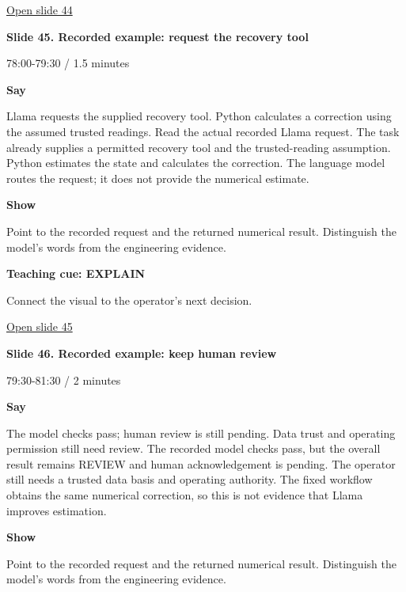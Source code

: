 \documentclass[12pt,letterpaper]{article}
\begin{document}
\vfill\href{https://alaaselim-sudo.github.io/GridGuard-Agentic-AI-Tutorials/operator-cases/#/44}{Open slide 44}\par
\clearpage{}
{\Large\bfseries\color{IEEEBlue} Slide 45. Recorded example: request the recovery tool\par}\medskip
{\small\color{Slate} 78:00-79:30 /\allowbreak{} 1.5 minutes\par}\medskip
\textbf{Say}\par Llama requests the supplied recovery tool. Python calculates a correction using the assumed trusted readings. Read the actual recorded Llama request. The task already supplies a permitted recovery tool and the trusted-reading assumption. Python estimates the state and calculates the correction. The language model routes the request; it does not provide the numerical estimate.\par\medskip
\textbf{Show}\par Point to the recorded request and the returned numerical result. Distinguish the model's words from the engineering evidence.\par\medskip
\textbf{Teaching cue: EXPLAIN}\par Connect the visual to the operator's next decision.\par\medskip
\vfill\href{https://alaaselim-sudo.github.io/GridGuard-Agentic-AI-Tutorials/operator-cases/#/45}{Open slide 45}\par
\clearpage{}
{\Large\bfseries\color{IEEEBlue} Slide 46. Recorded example: keep human review\par}\medskip
{\small\color{Slate} 79:30-81:30 /\allowbreak{} 2 minutes\par}\medskip
\textbf{Say}\par The model checks pass; human review is still pending. Data trust and operating permission still need review. The recorded model checks pass, but the overall result remains REVIEW and human acknowledgement is pending. The operator still needs a trusted data basis and operating authority. The fixed workflow obtains the same numerical correction, so this is not evidence that Llama improves estimation.\par\medskip
\textbf{Show}\par Point to the recorded request and the returned numerical result. Distinguish the model's words from the engineering evidence.\par\medskip
\end{document}
